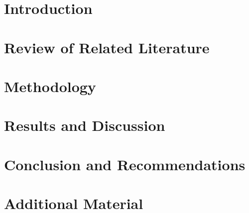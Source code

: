 \documentclass[a4paper,12pt,twoside,BCOR=10mm,toc=listof]{scrbook}
\begin{document}
\hypersetup{pageanchor=false}



\cleardoublepage
{}
\setcounter{page}{5}






\hypersetup{pageanchor=true}
\tableofcontents
\listoffigures
\listoftables
\lstlistoflistings


\cleardoublepage
{}
\setcounter{page}{1}
\chapter{Introduction}


\chapter{Review of Related Literature}


\chapter{Methodology}


\chapter{Results and Discussion}\label{chap:results}


\chapter{Conclusion and Recommendations}


\printbibliography[heading=bibintoc,title={References}]

\appendix
\chapter{Additional Material}

\end{document}
